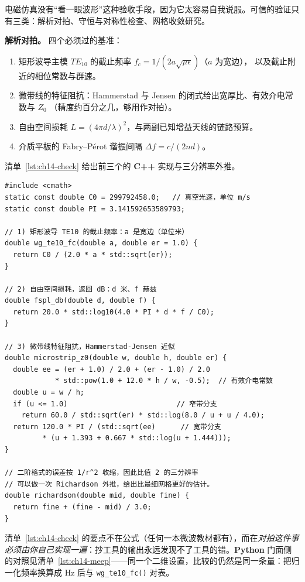 \documentclass[12pt,a4paper,fontset=fandol]{ctexbook}
\newcommand{\Fn}[1]{\texttt{#1()}}
\newcommand{\Lang}[1]{\textsf{\bfseries #1}}
\newcommand{\CPP}{\Lang{C++}}
\newcommand{\PY}{\Lang{Python}}
\begin{document}
电磁仿真没有``看一眼波形''这种验收手段，因为它太容易自我说服。可信的验证只有三类：解析对拍、守恒与对称性检查、网格收敛研究。

\textbf{解析对拍。} 四个必须过的基准：
\begin{enumerate}
  \item 矩形波导主模 $TE_{10}$ 的截止频率 $f_c = 1/(2a\sqrt{\mu\epsilon})$（$a$ 为宽边），
        以及截止附近的相位常数与群速。
  \item 微带线的特征阻抗：Hammerstad 与 Jensen 的闭式给出宽厚比、有效介电常数与 $Z_0$
        （精度约百分之几，够用作对拍）。
  \item 自由空间损耗 $L = (4\pi d/\lambda)^{2}$，与两副已知增益天线的链路预算。
  \item 介质平板的 Fabry--P\'erot 谐振间隔 $\Delta f = c/(2nd)$。
\end{enumerate}
清单~\ref{lst:ch14-check} 给出前三个的 \CPP{} 实现与三分辨率外推。

\begin{lstlisting}[style=cppstyle,label={lst:ch14-check},caption={三个解析基准的实现与三分辨率 Richardson 外推}]
#include <cmath>
static const double C0 = 299792458.0;   // 真空光速，单位 m/s
static const double PI = 3.141592653589793;

// 1) 矩形波导 TE10 的截止频率：a 是宽边（单位米）
double wg_te10_fc(double a, double er = 1.0) {
  return C0 / (2.0 * a * std::sqrt(er));
}

// 2) 自由空间损耗，返回 dB：d 米、f 赫兹
double fspl_db(double d, double f) {
  return 20.0 * std::log10(4.0 * PI * d * f / C0);
}

// 3) 微带线特征阻抗，Hammerstad-Jensen 近似
double microstrip_z0(double w, double h, double er) {
  double ee = (er + 1.0) / 2.0 + (er - 1.0) / 2.0
            * std::pow(1.0 + 12.0 * h / w, -0.5);  // 有效介电常数
  double u = w / h;
  if (u <= 1.0)                          // 窄带分支
    return 60.0 / std::sqrt(er) * std::log(8.0 / u + u / 4.0);
  return 120.0 * PI / (std::sqrt(ee)      // 宽带分支
         * (u + 1.393 + 0.667 * std::log(u + 1.444)));
}

// 二阶格式的误差按 1/r^2 收缩，因此比值 2 的三分辨率
// 可以做一次 Richardson 外推，给出比最细网格更好的估计。
double richardson(double mid, double fine) {
  return fine + (fine - mid) / 3.0;
}
\end{lstlisting}

清单~\ref{lst:ch14-check} 的要点不在公式（任何一本微波教材都有），而在\emph{对拍这件事必须由你自己实现一遍}：抄工具的输出永远发现不了工具的错。\PY{} 门面侧的对照见清单~\ref{lst:ch14-meep}——同一个二维设置，比较的仍然是同一条量：把归一化频率换算成 Hz 后与 \Fn{wg\_te10\_fc} 对表。
\end{document}
